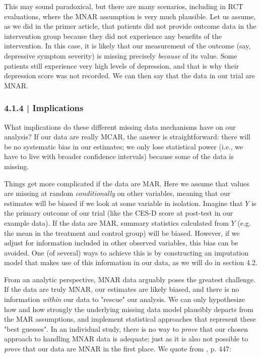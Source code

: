 This may sound paradoxical, but there are many scenarios, including in RCT evaluations, where the MNAR assumption is very much plausible. Let us assume, as we did in the primer article, that patients did not provide outcome data in the intervention group because they did not experience any benefits of the intervention. In this case, it is likely that our measurement of the outcome (say, depressive symptom severity) is missing precisely \emph{because} of its value. Some patients still experience very high levels of depression, and that is why their depression score was not recorded. We can then say that the data in our trial are MNAR.

\subsubsection{{\normalfont\textsf{\textcolor{sBlue}{\small 4.1.4 |}}} Implications}

What implications do these different missing data mechanisms have on our analysis? If our data are really MCAR, the answer is straightforward: there will be no systematic bias in our estimates; we only lose statistical power (i.e., we have to live with broader confidence intervals) because some of the data is missing. 

Things get more complicated if the data are MAR. Here we assume that values are missing at random \emph{conditionally} on other variables, meaning that our estimates will be biased if we look at some variable in isolation. Imagine that $Y$ is the primary outcome of our trial (like the CES-D score at post-test in our example data). If the data are MAR, summary statistics calculated from $Y$ (e.g. the mean in the treatment and control group) will be biased. However, if we adjust for information included in other observed variables, this bias can be avoided. One (of several) ways to achieve this is by constructing an imputation model that makes use of this information in our data, as we will do in section 4.2. 

From an analytic perspective, MNAR data arguably poses the greatest challenge. If the data are truly MNAR, our estimates are likely biased, and there is no information \emph{within} our data to "rescue" our analysis. We can only hypothesize how and how strongly the underlying missing data model plausibly departs from the MAR assumptions, and implement statistical approaches that represent these "best guesses". In an individual study, there is no way to \emph{prove} that our chosen approach to handling MNAR data is adequate; just as it is also not possible to \emph{prove} that our data are MNAR in the first place. We quote from \citet{molenberghs2004analyzing}, p. 447:

